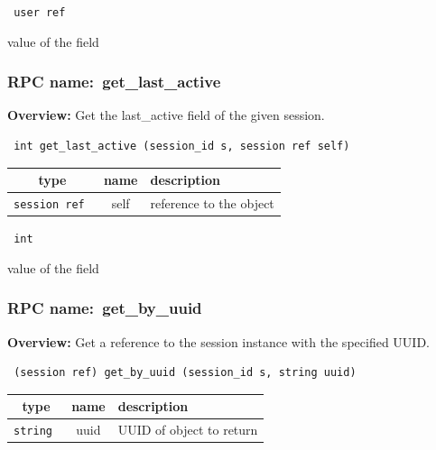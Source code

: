 \vspace{0.3cm}

{\tt 
user ref
}


value of the field
\vspace{0.3cm}
\vspace{0.3cm}
\vspace{0.3cm}
\subsubsection{RPC name:~get\_last\_active}

{\bf Overview:} 
Get the last\_active field of the given session.

\begin{verbatim} int get_last_active (session_id s, session ref self)\end{verbatim}



 
\vspace{0.3cm}
\begin{tabular}{|c|c|p{7cm}|}
 \hline
{\bf type} & {\bf name} & {\bf description} \\ \hline
{\tt session ref } & self & reference to the object \\ \hline 

\end{tabular}

\vspace{0.3cm}

{\tt 
int
}


value of the field
\vspace{0.3cm}
\vspace{0.3cm}
\vspace{0.3cm}
\subsubsection{RPC name:~get\_by\_uuid}

{\bf Overview:} 
Get a reference to the session instance with the specified UUID.

\begin{verbatim} (session ref) get_by_uuid (session_id s, string uuid)\end{verbatim}



 
\vspace{0.3cm}
\begin{tabular}{|c|c|p{7cm}|}
 \hline
{\bf type} & {\bf name} & {\bf description} \\ \hline
{\tt string } & uuid & UUID of object to return \\ \hline 

\end{tabular}

